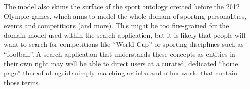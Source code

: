 \documentclass{llncs}
\begin{document}
The model also skims the surface of the sport ontology\cite{rayfield2011bbc}
created before the 2012 Olympic games, which aims to model the whole domain
of sporting personalities, events and competitions (and more). This might
be too fine-grained for the domain model used within the search application,
but it is likely that people will want to search for competitions like
``World Cup'' or sporting disciplines such as ``football''. A search application
that understands these concepts as entities in their own right may well
be able to direct users at a curated, dedicated ``home page'' thereof alongside
simply matching articles and other works that contain those terms.

\end{document}

